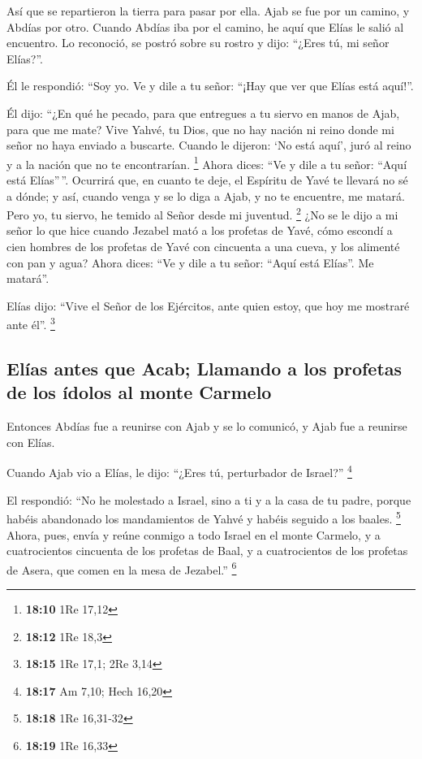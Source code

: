  Así que se repartieron la tierra para pasar por ella.
Ajab se fue por un camino, y Abdías por otro.  Cuando
Abdías iba por el camino, he aquí que Elías le salió al encuentro. Lo
reconoció, se postró sobre su rostro y dijo: ``¿Eres tú, mi señor
Elías?''.

 Él le respondió: ``Soy yo. Ve y dile a tu señor: ``¡Hay
que ver que Elías está aquí!''.

 Él dijo: ``¿En qué he pecado, para que entregues a tu
siervo en manos de Ajab, para que me mate?  Vive Yahvé,
tu Dios, que no hay nación ni reino donde mi señor no haya enviado a
buscarte. Cuando le dijeron: `No está aquí', juró al reino y a la nación
que no te encontrarían. \footnote{\textbf{18:10} 1Re 17,12}
 Ahora dices: ``Ve y dile a tu señor: ``Aquí está
Elías''\,''.  Ocurrirá que, en cuanto te deje, el
Espíritu de Yavé te llevará no sé a dónde; y así, cuando venga y se lo
diga a Ajab, y no te encuentre, me matará. Pero yo, tu siervo, he temido
al Señor desde mi juventud. \footnote{\textbf{18:12} 1Re 18,3}
 ¿No se le dijo a mi señor lo que hice cuando Jezabel
mató a los profetas de Yavé, cómo escondí a cien hombres de los profetas
de Yavé con cincuenta a una cueva, y los alimenté con pan y agua?
 Ahora dices: ``Ve y dile a tu señor: ``Aquí está
Elías''. Me matará''.

 Elías dijo: ``Vive el Señor de los Ejércitos, ante quien
estoy, que hoy me mostraré ante él''. \footnote{\textbf{18:15} 1Re 17,1;
  2Re 3,14}

\hypertarget{eluxedas-antes-que-acab-llamando-a-los-profetas-de-los-uxeddolos-al-monte-carmelo}{%
\subsection{Elías antes que Acab; Llamando a los profetas de los ídolos
al monte
Carmelo}\label{eluxedas-antes-que-acab-llamando-a-los-profetas-de-los-uxeddolos-al-monte-carmelo}}

 Entonces Abdías fue a reunirse con Ajab y se lo
comunicó, y Ajab fue a reunirse con Elías.

 Cuando Ajab vio a Elías, le dijo: ``¿Eres tú,
perturbador de Israel?'' \footnote{\textbf{18:17} Am 7,10; Hech 16,20}

 El respondió: ``No he molestado a Israel, sino a ti y a
la casa de tu padre, porque habéis abandonado los mandamientos de Yahvé
y habéis seguido a los baales. \footnote{\textbf{18:18} 1Re 16,31-32}
 Ahora, pues, envía y reúne conmigo a todo Israel en el
monte Carmelo, y a cuatrocientos cincuenta de los profetas de Baal, y a
cuatrocientos de los profetas de Asera, que comen en la mesa de
Jezabel.'' \footnote{\textbf{18:19} 1Re 16,33}

